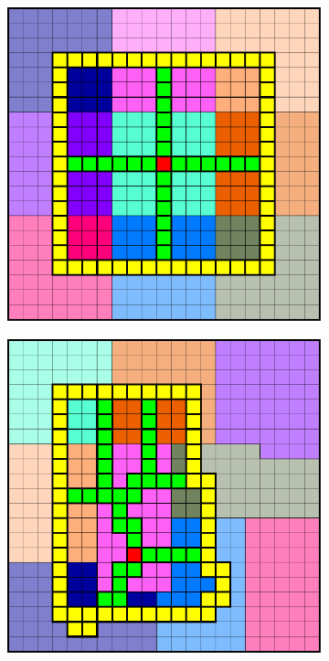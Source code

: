 \begin{figure}[htbp]
  \begin{subfigure}[t]{0.3\textwidth}
    \centerline{\includegraphics[width=0.9\linewidth]{figs/square_cart_struct_cell_supp}}
  \end{subfigure}
  \hfill
  \begin{subfigure}[t]{0.3\textwidth}
    \centerline{\includegraphics[width=0.9\linewidth]{figs/square_cart_metis_cell_supp}}

\end{subfigure}
\end{figure}
